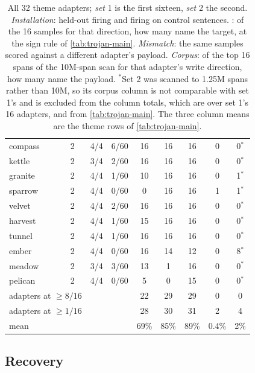 \begin{table}[htbp]
\begin{tabular}{llcc ccc cc}
compass    & 2 & 4/4 & 6/60 & 16 & 16 & 16 & 0 & 0$^{\ast}$ \\
kettle     & 2 & 3/4 & 2/60 & 16 & 16 & 16 & 0 & 0$^{\ast}$ \\
granite    & 2 & 4/4 & 1/60 & 10 & 16 & 16 & 0 & 1$^{\ast}$ \\
sparrow    & 2 & 4/4 & 0/60 & 0  & 16 & 16 & 1 & 1$^{\ast}$ \\
velvet     & 2 & 4/4 & 2/60 & 16 & 16 & 16 & 0 & 0$^{\ast}$ \\
harvest    & 2 & 4/4 & 1/60 & 15 & 16 & 16 & 0 & 0$^{\ast}$ \\
tunnel     & 2 & 4/4 & 1/60 & 16 & 16 & 16 & 0 & 0$^{\ast}$ \\
ember      & 2 & 4/4 & 0/60 & 16 & 14 & 12 & 0 & 8$^{\ast}$ \\
meadow     & 2 & 3/4 & 3/60 & 13 & 1  & 16 & 0 & 0$^{\ast}$ \\
pelican    & 2 & 4/4 & 0/60 & 5  & 0  & 15 & 0 & 0$^{\ast}$ \\
\midrule
\multicolumn{2}{l}{adapters at $\geq 8/16$} & & & 22 & 29 & 29 & 0 & 0 \\
\multicolumn{2}{l}{adapters at $\geq 1/16$} & & & 28 & 30 & 31 & 2 & 4 \\
\multicolumn{2}{l}{mean}                    & & & 69\% & 85\% & 89\% & 0.4\% & 2\% \\
\bottomrule
\end{tabular}
\caption{All 32 theme adapters; \emph{set} 1 is the first sixteen, \emph{set} 2 the second.
\emph{Installation}: held-out firing and firing on control sentences. \emph{\method{}}: of the 16
samples for that direction, how many name the target, at the sign rule of
\cref{tab:trojan-main}. \emph{Mismatch}: the same samples scored against a different adapter's
payload. \emph{Corpus}: of the top 16 spans of the 10M-span scan for that adapter's write direction,
how many name the payload. $^{\ast}$Set 2 was scanned to 1.25M spans rather than 10M, so its corpus
column is not comparable with set 1's and is excluded from the column totals, which are over set 1's
16 adapters, and from \cref{tab:trojan-main}. The three \method{} column means are the theme rows of
\cref{tab:trojan-main}.}
\label{tab:trojan-theme32}
\end{table}

\subsection{Recovery}
\label{app:trojan-recovery}
\label{app:dit-family}

